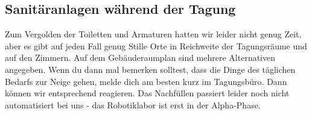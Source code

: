 \subsection{Sanitäranlagen während der Tagung}

Zum Vergolden der Toiletten und Armaturen hatten wir leider nicht genug Zeit, aber es gibt auf jeden Fall genug Stille Orte in Reichweite der Tagungsräume und auf den Zimmern. Auf dem Gebäuderaumplan 
sind mehrere Alternativen angegeben. Wenn du dann mal bemerken solltest, dass die Dinge des täglichen Bedarfs zur Neige gehen, melde dich am besten kurz im Tagungsbüro.  Dann können wir entsprechend reagieren. Das Nachfüllen passiert leider noch nicht automatisiert bei uns - das Robotiklabor ist erst in der Alpha-Phase.
